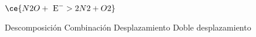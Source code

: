 $\ce{N2O + \text{ E} ^ -> 2N2 + O2}$

\begin{choices}
    \CorrectChoice Descomposición
    \choice Combinación
    \choice Desplazamiento
    \choice Doble desplazamiento
\end{choices}